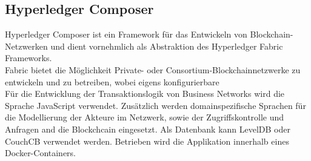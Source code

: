 \subsection{Hyperledger Composer}
\label{sec:prototype_composer}
        Hyperledger Composer ist ein Framework für das Entwickeln von Blockchain-Netzwerken und dient vornehmlich als Abstraktion des Hyperledger Fabric Frameworks. 
        \medskip\\
        Fabric bietet die Möglichkeit Private- oder Consortium-Blockchainnetzwerke zu entwickeln und zu betreiben, wobei eigens konfigurierbare 
        \medskip\\
        \noindent Für die Entwicklung der Transaktionslogik von Business Networks wird die Sprache JavaScript verwendet. 
        Zusätzlich werden domainspezifische Sprachen für die Modellierung der Akteure im Netzwerk, sowie der Zugriffskontrolle und Anfragen and die Blockchcain eingesetzt.
        Als Datenbank kann LevelDB oder CouchCB verwendet werden.
        Betrieben wird die Applikation innerhalb eines Docker-Containers.
        

